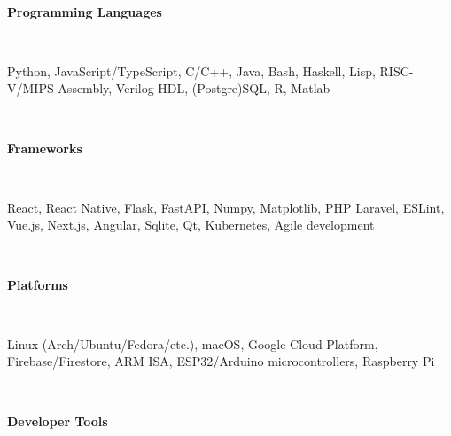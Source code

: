 \documentclass[letterpaper,10pt]{article}
\begin{document}
\begin{multicols*}{2}
  \vspace{.5em} \\
  \begin{large} \textbf{Programming Languages} \end{large}
  \vspace{3px} \\ \indent
  \begin{minipage}{.45\textwidth}
    \begin{flushleft}
      Python, JavaScript/TypeScript, C/C++, Java, Bash, Haskell, Lisp, RISC-V/MIPS Assembly, Verilog HDL, (Postgre)SQL, R, Matlab
    \end{flushleft}
  \end{minipage}
  \vspace{.5em} \\
  \begin{large} \textbf{Frameworks} \end{large}
  \vspace{3px} \\ \indent
  \begin{minipage}{.45\textwidth}
    \begin{flushleft}
      React, React Native, Flask, FastAPI, Numpy, Matplotlib, PHP Laravel, ESLint, Vue.js, Next.js, Angular, Sqlite, Qt, Kubernetes, Agile development
    \end{flushleft}
  \end{minipage}
  \vspace{.5em} \\
  \begin{large} \textbf{Platforms} \end{large}
  \vspace{3px} \\ \indent
  \begin{minipage}{.45\textwidth}
    \begin{flushleft}
      Linux (Arch/Ubuntu/Fedora/etc.), macOS, Google Cloud Platform, Firebase/Firestore, ARM ISA, ESP32/Arduino microcontrollers, Raspberry Pi
    \end{flushleft}
  \end{minipage}
  \vspace{.5em} \\
  \begin{large} \textbf{Developer Tools} \end{large}
  \vspace{3px} \\ \indent

\end{multicols*}
\end{document}
